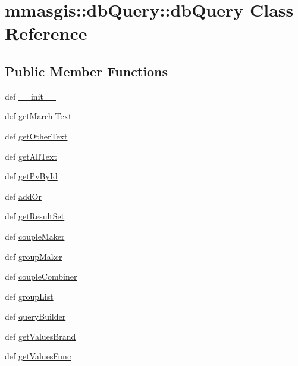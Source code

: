 \hypertarget{classmmasgis_1_1dbQuery_1_1dbQuery}{
\section{mmasgis::dbQuery::dbQuery Class Reference}
\label{classmmasgis_1_1dbQuery_1_1dbQuery}
}
\subsection*{Public Member Functions}
\begin{DoxyCompactItemize}
\item 
def \hyperlink{classmmasgis_1_1dbQuery_1_1dbQuery_a3c551728df385778ffe085a112c660db}{\_\-\_\-init\_\-\_\-}
\item 
def \hyperlink{classmmasgis_1_1dbQuery_1_1dbQuery_a0dd7988cd4df38802a455bed93e0f5fb}{getMarchiText}
\item 
def \hyperlink{classmmasgis_1_1dbQuery_1_1dbQuery_a0b0c6346348d9976869ce53fb5b149c1}{getOtherText}
\item 
def \hyperlink{classmmasgis_1_1dbQuery_1_1dbQuery_a23eb4184ada19092aa09b4d92aa9eb19}{getAllText}
\item 
def \hyperlink{classmmasgis_1_1dbQuery_1_1dbQuery_aa120514609f6f00af170cb4368e7faf1}{getPvById}
\item 
def \hyperlink{classmmasgis_1_1dbQuery_1_1dbQuery_a0590add98de9bd72ebcfbfbcc32d5d19}{addOr}
\item 
def \hyperlink{classmmasgis_1_1dbQuery_1_1dbQuery_aab2f0cdf19a30169be3e1dd68236e5a0}{getResultSet}
\item 
def \hyperlink{classmmasgis_1_1dbQuery_1_1dbQuery_a105b7c530c77cf4a513d2c6532bdabdf}{coupleMaker}
\item 
def \hyperlink{classmmasgis_1_1dbQuery_1_1dbQuery_a3e215001abc3efffebec805b79827893}{groupMaker}
\item 
def \hyperlink{classmmasgis_1_1dbQuery_1_1dbQuery_a022e5bfce2f370cb4e10dd19fb8a0d88}{coupleCombiner}
\item 
def \hyperlink{classmmasgis_1_1dbQuery_1_1dbQuery_ada99487403368b2e8c645a795f5da3cb}{groupList}
\item 
def \hyperlink{classmmasgis_1_1dbQuery_1_1dbQuery_a3e198fe5a62743ecaa8589d886494d4f}{queryBuilder}
\item 
def \hyperlink{classmmasgis_1_1dbQuery_1_1dbQuery_a1a6bf187bfd1521f12d00fe45d4d797d}{getValuesBrand}
\item 
def \hyperlink{classmmasgis_1_1dbQuery_1_1dbQuery_ac2d74f9a7d3d4d2926142f16dc2b2765}{getValuesFunc}

\end{DoxyCompactItemize}
